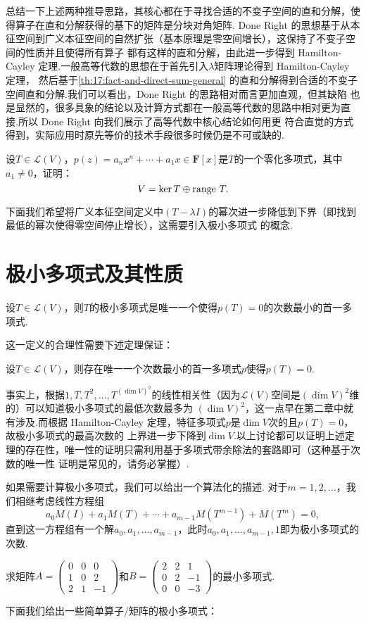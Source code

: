 总结一下上述两种推导思路，其核心都在于寻找合适的不变子空间的直和分解，使得算子在直和分解获得的基下的矩阵是分块对角矩阵.
 Done Right 的思想基于从本征空间到广义本征空间的自然扩张（基本原理是零空间增长），这保持了不变子空间的性质并且使得所有算子
都有这样的直和分解，由此进一步得到 Hamilton-Cayley 定理.一般高等代数的思想在于首先引入$\lambda$矩阵理论得到 Hamilton-Cayley 定理，
然后基于\autoref{th:17:fact-and-direct-sum-general} 的直和分解得到合适的不变子空间直和分解.我们可以看出，Done Right 的思路相对而言更加直观，但其缺陷
也是显然的，很多具象的结论以及计算方式都在一般高等代数的思路中相对更为直接.所以 Done Right 向我们展示了高等代数中核心结论如何用更
符合直觉的方式得到，实际应用时原先等价的技术手段很多时候仍是不可或缺的.
\begin{example}
    设$T\in \mathcal{L}(V)$，$p(z)=a_nx^n+\cdots+a_1x\in\mathbf{F}[x]$是$T$的一个零化多项式，其中$a_1\neq 0$，证明：
    \[V=\ker T\oplus\textup{range }T.\]
\end{example}
下面我们希望将广义本征空间定义中$(T-\lambda I)$的幂次进一步降低到下界（即找到最低的幂次使得零空间停止增长），这需要引入极小多项式
的概念.

\section{极小多项式及其性质}
\begin{definition}
    设$T\in \mathcal{L}(V)$，则$T$的极小多项式是唯一一个使得$p(T)=0$的次数最小的首一多项式.
\end{definition}
这一定义的合理性需要下述定理保证：
\begin{theorem}
    设$T\in \mathcal{L}(V)$，则存在唯一一个次数最小的首一多项式$p$使得$p(T)=0$.
\end{theorem}
事实上，根据$1,T,T^2,\ldots,T^{(\dim V)^2}$的线性相关性（因为$\mathcal{L}(V)$空间是$(\dim V)^2$维的）可以知道极小多项式的最低次数最多为
$(\dim V)^2$，这一点早在第二章中就有涉及.而根据 Hamilton-Cayley 定理，特征多项式$p$是$\dim V$次的且$p(T)=0$，故极小多项式的最高次数的
上界进一步下降到$\dim V$.以上讨论都可以证明上述定理的存在性，唯一性的证明只需利用基于多项式带余除法的套路即可（这种基于次数的唯一性
证明是常见的，请务必掌握）.

如果需要计算极小多项式，我们可以给出一个算法化的描述. 对于$m=1,2,\ldots$，我们相继考虑线性方程组
\[a_0M(I)+a_1M(T)+\cdots+a_{m-1}M(T^{m-1})+M(T^m)=0,\]
直到这一方程组有一个解$a_0,a_1,\ldots,a_{m-1}$，此时$a_0,a_1,\ldots,a_{m-1},1$即为极小多项式的次数.
\begin{example} \label{ex:17:minimal-poly}
    求矩阵$A=\begin{pmatrix}
        0 & 0 & 0 \\ 1 & 0 & 2 \\ 2 & 1 & -1
    \end{pmatrix}$和$B=\begin{pmatrix}
        2 & 2 & 1 \\ 0 & 2 & -1 \\ 0 & 0 & -3
    \end{pmatrix}$的最小多项式.
\end{example}
下面我们给出一些简单算子/矩阵的极小多项式：

